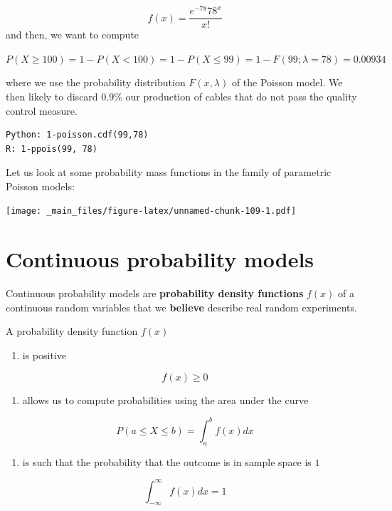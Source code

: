 \documentclass[
]{book}
\providecommand{\tightlist}{%
  \setlength{\itemsep}{0pt}\setlength{\parskip}{0pt}}
\begin{document}
\[f(x)= \frac{e^{-78}78^x}{x!}\]
and then, we want to compute

\(P(X\geq 100)=1-P(X < 100)=1-P(X \leq 99)=1-F(99; \lambda=78)=0.00934\)

where we use the probability distribution \(F(x,\lambda)\) of the Poisson model. We then likely to discard \(0.9\%\) our production of cables that do not pass the quality control measure.

\begin{verbatim}
Python: 1-poisson.cdf(99,78)
R: 1-ppois(99, 78)
\end{verbatim}

Let us look at some probability mass functions in the family of parametric Poisson models:

\texttt{[image: \_main\_files/figure-latex/unnamed-chunk-109-1.pdf]}

\hypertarget{continuous-probability-models}{%
\section{Continuous probability models}\label{continuous-probability-models}}

Continuous probability models are \textbf{probability density functions} \(f(x)\) of a continuous random variables that we \textbf{believe} describe real random experiments.

A probability density function \(f(x)\)

\begin{enumerate}
\def\labelenumi{\arabic{enumi})}
\tightlist
\item
  is positive
\end{enumerate}

\[f(x) \geq 0\]

\begin{enumerate}
\def\labelenumi{\arabic{enumi})}
\setcounter{enumi}{1}
\tightlist
\item
  allows us to compute probabilities using the area under the curve
\end{enumerate}

\[P(a\leq X \leq b)=\int_{a}^{b} f(x) dx\]

\begin{enumerate}
\def\labelenumi{\arabic{enumi})}
\setcounter{enumi}{2}
\tightlist
\item
  is such that the probability that the outcome is in sample space is \(1\)
\end{enumerate}

\[\int_{-\infty}^{\infty} f(x) dx = 1\]
\end{document}
